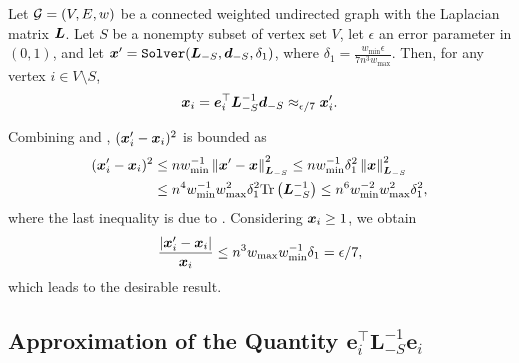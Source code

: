 \documentclass[10pt,twocolumn,twoside]{IEEEtran}
\begin{document}
\begin{lemma}\label{lem:approx-numer}
    Let \(\mathcal{G}=(V,E,w)\) be a connected weighted undirected graph with the Laplacian matrix \(\boldsymbol{L}\). Let  \(S\) be a nonempty subset of vertex set $V$, let $\epsilon$ an error parameter in  $(0,1)$, and let \(\boldsymbol{x}'=\mathtt{Solver}(\boldsymbol{L}_{-S},\boldsymbol{d}_{-S},\delta_1)\), where \(\delta_1=\frac{w_{\min}\epsilon}{7n^3w_{\max}}\). Then, for any vertex \(i\in V\setminus S\),
    \begin{equation}\label{eq:approx-numer}
        \boldsymbol{x}_i=\boldsymbol{e}_i^\top\boldsymbol{L}_{-S}^{-1}\boldsymbol{d}_{-S}\approx_{\epsilon/7}\boldsymbol{x}'_i.
    \end{equation}
\end{lemma}
\begin{IEEEproof}
    Combining  and , \((\boldsymbol{x}'_i-\boldsymbol{x}_i)^2\) is bounded  as
    \begin{align*}
        (\boldsymbol{x}'_i-\boldsymbol{x}_i)^2
         & \le nw_{\min}^{-1}\left\Vert\boldsymbol{x}'-\boldsymbol{x}\right\Vert^2_{\boldsymbol{L}_{-S}}
        \le nw_{\min}^{-1}\delta_1^2\left\Vert\boldsymbol{x}\right\Vert^2_{\boldsymbol{L}_{-S}}             \\
         & \le n^4w_{\min}^{-1}w_{\max}^2\delta_1^2\mathrm{Tr}\left(\boldsymbol{L}_{-S}^{-1}\right)
        \le n^6w_{\min}^{-2}w_{\max}^2\delta_1^2,
    \end{align*}
    where the last inequality is due to .
    Considering \(\boldsymbol{x}_i\ge1\), we obtain
    \begin{equation*}
        \frac{\left|\boldsymbol{x}'_i-\boldsymbol{x}_i \right|}{\boldsymbol{x}_i}\le n^3w_{\max}w_{\min}^{-1}\delta_1=\epsilon/7,
    \end{equation*}
    which leads to the desirable  result.
\end{IEEEproof}



\subsection{Approximation of the Quantity $\mathbf{e}_i^\top \mathbf{L}_{-S}^{-1}\mathbf{e}_i$}
\end{document}
